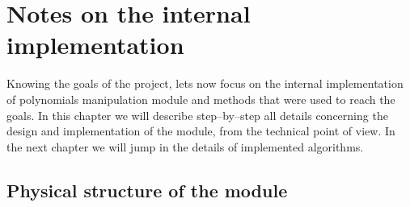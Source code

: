 \hypertarget{--doc-src/internals}{}

\section{Notes on the internal implementation}\label{thesis-internals}

Knowing the goals of the project, lets now focus on the internal implementation of polynomials
manipulation module and methods that were used to reach the goals. In this chapter we will describe
step--by--step all details concerning the design and implementation of the module, from the technical
point of view. In the next chapter we will jump in the details of implemented algorithms.


\subsection{Physical structure of the module}

